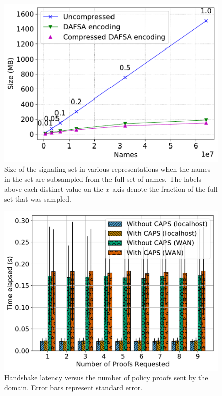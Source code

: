 \begin{figure}[t]
  \centering
  \includegraphics[width=\linewidth]{fig/sample}
  \caption{Size of the signaling set in various representations when 
           the names in the set are subsampled from the full set of names. 
           The labels above each distinct value on the $x$-axis
           denote the fraction of the full set that was sampled.}
  \label{fig:sample}
\end{figure}

\begin{figure}[t]
  \centering
  \includegraphics[width=\linewidth]{fig/eval_tls_ext/0-time_elapsed_vs_num_proofs_requested}
  \caption{Handshake latency versus the number of policy proofs sent by the
  domain. Error bars represent standard error.}
  \label{fig:numproofs}
\end{figure}

